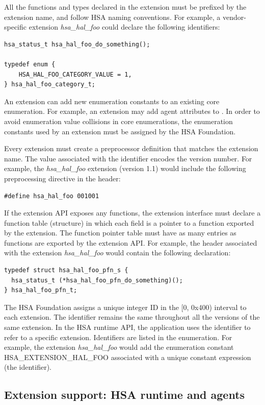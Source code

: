 \documentclass[oneside]{book}
\begin{document}
All the functions and types declared in the extension must be prefixed by the
extension name, and follow HSA naming conventions. For example, a
vendor-specific extension \textit{hsa_hal_foo} could declare the following
identifiers:
\begin{lstlisting}
hsa_status_t hsa_hal_foo_do_something();

typedef enum {
    HSA_HAL_FOO_CATEGORY_VALUE = 1,
} hsa_hal_foo_category_t;
\end{lstlisting}

An extension can add new enumeration constants to an existing core
enumeration. For example, an extension may add agent attributes to
. In order to avoid enumeration value collisions in
core enumerations, the enumeration constants used by an extension must be
assigned by the HSA Foundation.

Every extension must create a preprocessor definition that matches the extension
name. The value associated with the identifier encodes the version number. For
example, the \textit{hsa_hal_foo} extension (version 1.1) would include the
following preprocessing directive in the header:
\begin{lstlisting}
#define hsa_hal_foo 001001
\end{lstlisting}

If the extension API exposes any functions, the extension interface must declare
a function table (structure) in which each field is a pointer to a
function exported by the extension. The function pointer table must have as many
entries as functions are exported by the extension API. For example, the header
associated with the extension \textit{hsa_hal_foo} would contain the following
declaration:
\begin{lstlisting}
typedef struct hsa_hal_foo_pfn_s {
  hsa_status_t (*hsa_hal_foo_pfn_do_something)();
} hsa_hal_foo_pfn_t;
\end{lstlisting}

The HSA Foundation assigns a unique integer ID in the [0, 0x400) interval to
each extension. The identifier remains the same throughout all the versions of
the same extension. In the HSA runtime API, the application uses the identifier
to refer to a specific extension. Identifiers are listed in the
 enumeration. For example, the extension
\textit{hsa_hal_foo} would add the enumeration constant HSA_EXTENSION_HAL_FOO
associated with a unique constant expression (the identifier).

\subsection{Extension support: HSA runtime and agents}
\end{document}
